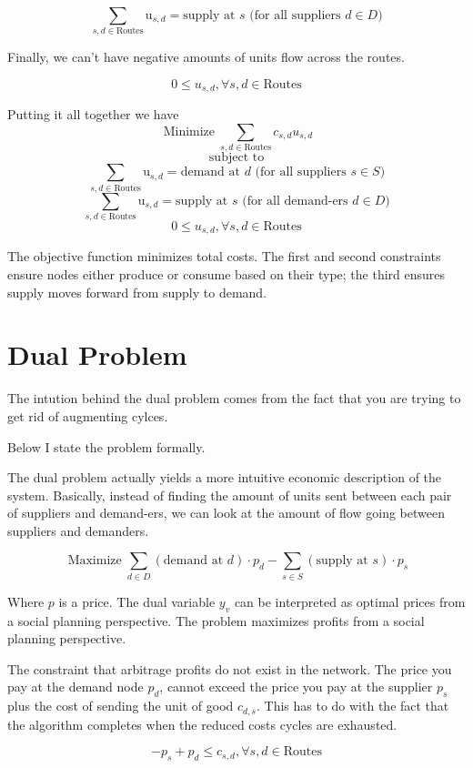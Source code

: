\documentclass{report}
\begin{document}
$$\sum_{s,d \in \text{Routes}} \text{u}_{s,d}= \text{supply at } s \text{ (for all suppliers } d \in D)$$

Finally, we can't have negative amounts of units flow across the routes.

$$0 \leq u_{s,d}, \forall s,d \in \text{Routes}$$

Putting it all together we have
$$\operatorname{Minimize} \sum_{s,d \in \text{Routes}} c_{s,d} u_{s,d}$$
$$\text{subject to}$$
$$\sum_{s,d \in \text{Routes}} \text{u}_{s,d}= \text{demand at } d \text{ (for all suppliers } s \in S)$$
$$\sum_{s,d \in \text{Routes}} \text{u}_{s,d}= \text{supply at } s \text{ (for all demand-ers } d \in D)$$
$$0 \leq u_{s,d}, \forall s,d \in \text{Routes}$$

The objective function minimizes total costs. The first and second constraints ensure nodes either produce or consume based on their type; the third ensures supply moves forward from supply to demand.

\section{Dual Problem}

The intution behind the dual problem comes from the fact that you are trying to get rid of augmenting cylces.

Below I state the problem formally.

\noindent The dual problem actually yields a more intuitive economic description of the system. Basically, instead of finding the amount of units sent between each pair of suppliers and demand-ers, we can look at the amount of flow going between suppliers and demanders.

$$\operatorname{Maximize} \sum_{d \in D}  (\text{demand at } d) \cdot p_{d} -   \sum_{s \in S}  (\text{supply at } s) \cdot p_{s} $$

Where $p$ is a price. The dual variable $y_v$ can be interpreted as optimal prices from a social planning perspective. The problem maximizes profits from a social planning perspective.

The constraint that arbitrage profits do not exist in the network. The price you pay at the demand node $p_d$, cannot exceed the price you pay at the supplier $p_s$ plus the cost of sending the unit of good $c_{d,s}$. This has to do with the fact that the algorithm completes when the reduced costs cycles are exhausted.

$$ -p_s + p_d \leq c_{s,d}, \forall s,d\in \textrm{Routes}$$
\end{document}

